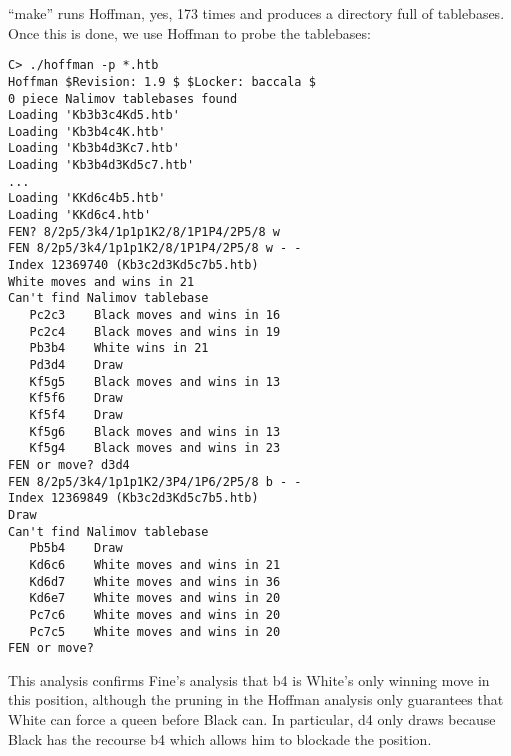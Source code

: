 \documentclass[11pt]{article}
\begin{document}
``make'' runs Hoffman, yes, 173 times and produces a directory full of
tablebases.  Once this is done, we use Hoffman to probe the tablebases:

\begin{verbatim}
C> ./hoffman -p *.htb
Hoffman $Revision: 1.9 $ $Locker: baccala $
0 piece Nalimov tablebases found
Loading 'Kb3b3c4Kd5.htb'
Loading 'Kb3b4c4K.htb'
Loading 'Kb3b4d3Kc7.htb'
Loading 'Kb3b4d3Kd5c7.htb'
...
Loading 'KKd6c4b5.htb'
Loading 'KKd6c4.htb'
FEN? 8/2p5/3k4/1p1p1K2/8/1P1P4/2P5/8 w
FEN 8/2p5/3k4/1p1p1K2/8/1P1P4/2P5/8 w - -
Index 12369740 (Kb3c2d3Kd5c7b5.htb)
White moves and wins in 21
Can't find Nalimov tablebase
   Pc2c3    Black moves and wins in 16
   Pc2c4    Black moves and wins in 19
   Pb3b4    White wins in 21
   Pd3d4    Draw
   Kf5g5    Black moves and wins in 13
   Kf5f6    Draw
   Kf5f4    Draw
   Kf5g6    Black moves and wins in 13
   Kf5g4    Black moves and wins in 23
FEN or move? d3d4
FEN 8/2p5/3k4/1p1p1K2/3P4/1P6/2P5/8 b - -
Index 12369849 (Kb3c2d3Kd5c7b5.htb)
Draw
Can't find Nalimov tablebase
   Pb5b4    Draw
   Kd6c6    White moves and wins in 21
   Kd6d7    White moves and wins in 36
   Kd6e7    White moves and wins in 20
   Pc7c6    White moves and wins in 20
   Pc7c5    White moves and wins in 20
FEN or move?
\end{verbatim}

This analysis confirms Fine's analysis that b4 is White's only winning
move in this position, although the pruning in the Hoffman analysis
only guarantees that White can force a queen before Black can.  In
particular, d4 only draws because Black has the recourse b4 which
allows him to blockade the position.
\end{document}
